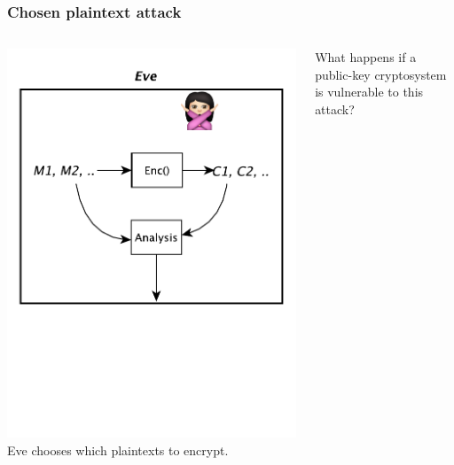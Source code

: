 \documentclass{beamer}
\newcommand{\<}{\langle}
\renewcommand{\>}{\rangle}
\begin{document}
\begin{frame}
\frametitle{Chosen plaintext attack}
\begin{columns}
\centering
\includegraphics[scale=.5]{IMG/attack2half.pdf}
Eve chooses which plaintexts to encrypt. \newline

What happens if a public-key cryptosystem is vulnerable to this attack?
\end{columns} 
\end{frame}
\end{document}
